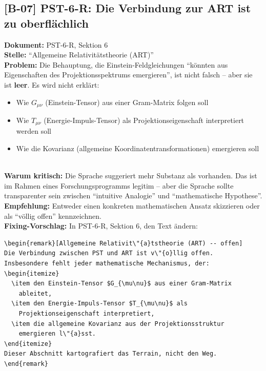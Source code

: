 \documentclass[11pt,a4paper]{article}
\newcommand{\B}[1]{\textbf{[B-#1]}}
\newcommand{\Dok}[1]{\textbf{Dokument:} #1\\}
\newcommand{\Stelle}[1]{\textbf{Stelle:} #1\\}
\newcommand{\Prob}[1]{\textbf{Problem:} #1\\}
\newcommand{\Krit}[1]{\textbf{Warum kritisch:} #1\\}
\newcommand{\Empf}[1]{\textbf{Empfehlung:} #1\\}
\newcommand{\Fix}[1]{\textbf{Fixing-Vorschlag:} #1\\}
\begin{document}
\subsection{\B{07} PST-6-R: Die Verbindung zur ART ist zu oberfl\"{a}chlich}

\Dok{PST-6-R, Sektion 6}
\Stelle{``Allgemeine Relativit\"{a}tstheorie (ART)''}
\Prob{Die Behauptung, die Einstein-Feldgleichungen ``k\"{o}nnten aus
Eigenschaften des Projektionsspektrums emergieren'', ist nicht
falsch -- aber sie ist \textbf{leer}. Es wird nicht erkl\"{a}rt:
\begin{itemize}
  \item Wie $G_{\mu\nu}$ (Einstein-Tensor) aus einer Gram-Matrix folgen
    soll
  \item Wie $T_{\mu\nu}$ (Energie-Impuls-Tensor) als
    Projektionseigenschaft interpretiert werden soll
  \item Wie die Kovarianz (allgemeine Koordinatentransformationen)
    emergieren soll
\end{itemize}}
\Krit{Die Sprache suggeriert mehr Substanz als vorhanden. Das ist
im Rahmen eines Forschungsprogramms legitim -- aber die Sprache
sollte transparenter sein zwischen ``intuitive Analogie'' und
``mathematische Hypothese''.}
\Empf{Entweder einen konkreten mathematischen Ansatz skizzieren
oder als ``v\"{o}llig offen'' kennzeichnen.}
\Fix{In PST-6-R, Sektion 6, den Text \"{a}ndern:
\begin{verbatim}
\begin{remark}[Allgemeine Relativit\"{a}tstheorie (ART) -- offen]
Die Verbindung zwischen PST und ART ist v\"{o}llig offen.
Insbesondere fehlt jeder mathematische Mechanismus, der:
\begin{itemize}
  \item den Einstein-Tensor $G_{\mu\nu}$ aus einer Gram-Matrix
    ableitet,
  \item den Energie-Impuls-Tensor $T_{\mu\nu}$ als
    Projektionseigenschaft interpretiert,
  \item die allgemeine Kovarianz aus der Projektionsstruktur
    emergieren l\"{a}sst.
\end{itemize}
Dieser Abschnitt kartografiert das Terrain, nicht den Weg.
\end{remark}
\end{verbatim}}

\newpage

\end{document}
